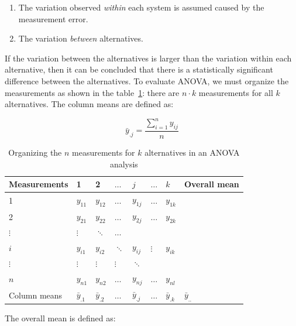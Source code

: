 \begin{enumerate}
\item The variation observed \emph{within} each system is assumed caused by the
measurement error.
\item The variation \emph{between} alternatives.
\end{enumerate}

If the variation between the alternatives is larger than the variation within each alternative, then it can be concluded that there is a statistically significant difference between the alternatives. To evaluate ANOVA, we must organize the measurements as shown in the table~\ref{table:anova}: there are \(n \cdot k\) measurements for all \(k\) alternatives. The column means are defined as:

\begin{equation}
  \bar{y}_{.j} = \frac{\sum^n_{i = 1}y_{ij}}{n}
\end{equation}


\begin{table}
\begin{center}
\begin{tabular}{|l|l|l|l|l|l|l|l|}
\hline
Measurements & 1 & 2 & \(\hdots\) & \(j\) & \(\hdots\) & \(k\) & Overall mean\\[0pt]
\hline
1 & \(y_{11}\) & \(y_{12}\) & \(\hdots\) & \(y_{1j}\) & \(\hdots\) & \(y_{1k}\) & \\[0pt]
2 & \(y_{21}\) & \(y_{22}\) & \(\hdots\) & \(y_{2j}\) & \(\hdots\) & \(y_{2k}\) & \\[0pt]
\(\vdots\) & \(\vdots\) & \(\ddots\) & \(\hdots\) &  &  &  & \\[0pt]
\(i\) & \(y_{i1}\) & \(y_{i2}\) & \(\ddots\) & \(y_{ij}\) & \(\vdots\) & \(y_{ik}\) & \\[0pt]
\(\vdots\) & \(\vdots\) & \(\vdots\) & \(\vdots\) & \(\ddots\) &  &  & \\[0pt]
\(n\) & \(y_{n1}\) & \(y_{n2}\) & \(\hdots\) & \(y_{nj}\) & \(\hdots\) & \(y_{nl}\) & \\[0pt]
\hline
Column means & \(\bar{y}_{.1}\) & \(\bar{y}_{.2}\) & \(\hdots\) & \(\bar{y}_{.j}\) & \(\hdots\) & \(\bar{y}_{.k}\) & \(\bar{y}_{..}\)\\[0pt]
\hline
\end{tabular}
\end{center}
\caption{\label{table:anova}Organizing the \(n\) measurements for \(k\) alternatives in an ANOVA analysis}
\end{table}

The overall mean is defined as:

